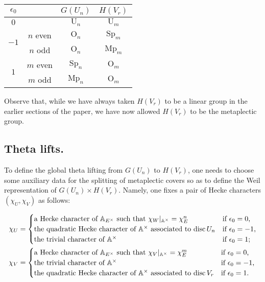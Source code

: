 \documentclass[10pt]{amsart}
\theoremstyle{plain}
\numberwithin{equation}{section}
\begin{document}
 \begin{center}
 \begin{tabular}{|c|c|c|c|}
 \hline
 $\epsilon_0 $ &   &  $G(U_n)$ & $H(V_r)$ \\
 \hline
 $0$  &  & ${\operatorname{U}}_n$ & ${\operatorname{U}}_m$  \\
 \hline
\multirow{2}{*}{$-1$} & $n$ even &   ${\operatorname{O}}_n$ & ${\operatorname{Sp}}_m$  \\
 \cline{2-4}
  &$n$ odd & ${\operatorname{O}}_n$ & ${\operatorname{Mp}}_m$ \\
  \hline
  \multirow{2}{*}{$1$} & $m$ even & ${\operatorname{Sp}}_n$ & ${\operatorname{O}}_m$ \\
  \cline{2-4}
  & $m$ odd & ${\operatorname{Mp}}_n$ & ${\operatorname{O}}_m$ \\
  \hline
\end{tabular}
\end{center}
 \vskip 5pt
 
 Observe that, while we have always taken $H(V_r)$ to be a linear
 group in the earlier sections of the paper, we have now allowed
 $H(V_r)$ to be the metaplectic group.
 
\vskip 5pt
    
 \subsection{\bf Theta lifts.}
 To  define the global theta lifting from $G(U_n)$ to $H(V_r)$, one
 needs to choose some auxiliary data for the splitting of metaplectic
 covers so as to define the Weil representation of $G(U_n) \times
 H(V_r)$. Namely, one fixes a pair of Hecke characters $ (\chi_U,
 \chi_V)$ as follows:
 
 \begin{align*}
\chi_U & = 
 \begin{cases}
  \text{a Hecke character of ${\mathbb{A}}_{E^{\times}}$ such that
  $\chi_W|_{{\mathbb{A}}^{\times}} = \chi_E^n$}
  & \text{if $\epsilon_0 = 0$,} \\
  \text{the quadratic Hecke character of ${\mathbb{A}}^{\times}$
  associated to ${{\rm disc}}\, U_n$}
  & \text{if $\epsilon_0 =-1$,} \\
  \text{the trivial character of ${\mathbb{A}}^{\times}$}
  & \text{if $\epsilon_0 = 1$;}
 \end{cases}\\
 \chi_V & = 
 \begin{cases}
  \text{a Hecke character of ${\mathbb{A}}_{E^{\times}}$ such that 
  $\chi_V|_{{\mathbb{A}}^{\times}} = \chi_E^m$}
  & \text{if $\epsilon_0 = 0$,} \\
  \text{the trivial character of ${\mathbb{A}}^{\times}$}
  & \text{if $\epsilon_0 = -1$,} \\
  \text{the quadratic Hecke character of ${\mathbb{A}}^{\times}$
  associated to ${{\rm disc}}\,V_r$}
  & \text{if $\epsilon_0 = 1$.}
 \end{cases}
\end{align*}
\end{document}
